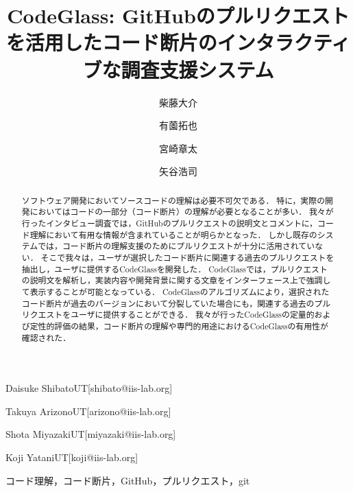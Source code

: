 \documentclass[submit,techrep,noauthor]{ipsj}
\begin{document}
\title{CodeGlass: GitHubのプルリクエストを活用したコード断片のインタラクティブな調査支援システム}





\author{柴藤大介}{Daisuke Shibato}{UT}[shibato@iis-lab.org]
\author{有薗拓也}{Takuya Arizono}{UT}[arizono@iis-lab.org]
\author{宮崎章太}{Shota Miyazaki}{UT}[miyazaki@iis-lab.org]
\author{矢谷浩司}{Koji Yatani}{UT}[koji@iis-lab.org]

\begin{abstract}
ソフトウェア開発においてソースコードの理解は必要不可欠である．
特に，実際の開発においてはコードの一部分（コード断片）の理解が必要となることが多い．
我々が行ったインタビュー調査では，GitHubのプルリクエストの説明文とコメントに，コード理解において有用な情報が含まれていることが明らかとなった．
しかし既存のシステムでは，コード断片の理解支援のためにプルリクエストが十分に活用されていない．
そこで我々は，ユーザが選択したコード断片に関連する過去のプルリクエストを抽出し，ユーザに提供するCodeGlassを開発した．
CodeGlassでは，プルリクエストの説明文を解析し，実装内容や開発背景に関する文章をインターフェース上で強調して表示することが可能となっている．
CodeGlassのアルゴリズムにより，選択されたコード断片が過去のバージョンにおいて分裂していた場合にも，関連する過去のプルリクエストをユーザに提供することができる．
我々が行ったCodeGlassの定量的および定性的評価の結果，コード断片の理解や専門的用途におけるCodeGlassの有用性が確認された．
\end{abstract}


\begin{jkeyword}
コード理解，コード断片，GitHub，プルリクエスト，git
\end{jkeyword}
\end{document}
